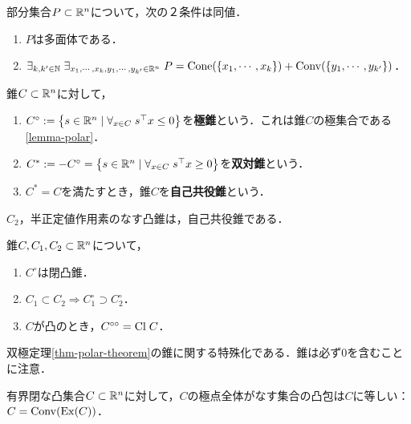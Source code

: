 \documentclass[uplatex,dvipdfmx]{jsreport}
\begin{document}
\begin{lemma}[多面体の特徴付け]
    部分集合$P\subset\mathbb{R}^n$について，次の２条件は同値．
    \begin{enumerate}
        \item $P$は多面体である．
        \item $\exists_{k,k'\in\mathbb{N}}\;\exists_{x_1,\cdots,x_k,y_1,\cdots,y_{k'}\in\mathbb{R}^n}\;P=\mathrm{Cone}(\{x_1,\cdots,x_k\})+\mathrm{Conv}(\{y_1,\cdots,y_{k'}\})$．
    \end{enumerate}
\end{lemma}

\begin{definition}
    錐$C\subset\mathbb{R}^n$に対して，
    \begin{enumerate}
        \item $C^\circ:=\left\{s\in\mathbb{R}^n\mid\forall_{x\in C}\;s^\top x\le0\right\}$を\textbf{極錐}という．これは錐$C$の極集合である\ref{lemma-polar}．
        \item $C^*:=-C^\circ=\left\{s\in\mathbb{R}^n\mid\forall_{x\in C}\; s^\top x\ge0\right\}$を\textbf{双対錐}という．
        \item $C^*=C$を満たすとき，錐$C$を\textbf{自己共役錐}という．
    \end{enumerate}
\end{definition}

\begin{example}[自己共役錐]
    $C_2$，半正定値作用素のなす凸錐は，自己共役錐である．
\end{example}

\begin{corollary}[双極定理]
    錐$C,C_1,C_2\subset\mathbb{R}^n$について，
    \begin{enumerate}
        \item $C^\circ$は閉凸錐．
        \item $C_1\subset C_2\Rightarrow C_1^\circ\supset C_2^\circ$．
        \item $C$が凸のとき，$C^{\circ\circ}=\mathrm{Cl}\;C$．
    \end{enumerate}
\end{corollary}
\begin{Proof}
    双極定理\ref{thm-polar-theorem}の錐に関する特殊化である．錐は必ず$0$を含むことに注意．
\end{Proof}

\begin{corollary}
    有界閉な凸集合$C\subset\mathbb{R}^n$に対して，$C$の極点全体がなす集合の凸包は$C$に等しい：$C=\mathrm{Conv}(\mathrm{Ex}(C))$．
\end{corollary}
\end{document}
